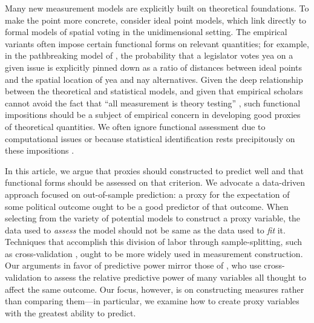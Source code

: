 
Many new measurement models are explicitly built on theoretical foundations. 
To make the point more concrete, consider ideal point models, which link directly to formal models of spatial voting in the unidimensional setting. 
The empirical variants often impose certain functional forms on relevant quantities; for example, in the pathbreaking model of \citet{poole1985}, the probability that a legislator votes yea on a given issue is explicitly pinned down as a ratio of distances between ideal points and the spatial location of yea and nay alternatives. 
Given the deep relationship between the theoretical and statistical models, and given that empirical scholars cannot avoid the fact that ``all measurement is theory testing'' \citep[272]{jacoby1999}, such functional impositions should be a subject of empirical concern in developing good proxies of theoretical quantities. 
We often ignore functional assessment due to computational issues or because statistical identification rests precipitously on these impositions \citep{poole1991}.

In this article, we argue that proxies should constructed to predict well and that functional forms should be assessed on that criterion. 
We advocate a data-driven approach focused on out-of-sample prediction: a proxy for the expectation of some political outcome ought to be a good predictor of that outcome. 
When selecting from the variety of potential models to construct a proxy variable, the data used to \emph{assess} the model should not be same as the data used to \emph{fit} it.
Techniques that accomplish this division of labor through sample-splitting, such as cross-validation \citep{Efron:2012es}, ought to be more widely used in measurement construction.
Our arguments in favor of predictive power mirror those of \citet{Hill:2014ki}, who use cross-validation to assess the relative predictive power of many variables all thought to affect the same outcome.
Our focus, however, is on constructing measures rather than comparing them---in particular, we examine how to create proxy variables with the greatest ability to predict.

